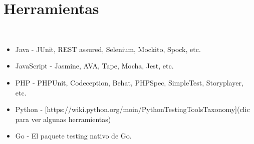 \section{Herramientas} 
\textbf{}\\
\begin{flushleft}


\begin{itemize}
Dependiendo del lenguaje de programación, puedes escoger entre decenas de frameworks que te permitirán hacer pruebas, algunos conocidos son:
\item	Java - JUnit, REST assured, Selenium, Mockito, Spock, etc.
\item	JavaScript - Jasmine, AVA, Tape, Mocha, Jest, etc.
\item	PHP - PHPUnit, Codeception, Behat, PHPSpec, SimpleTest, Storyplayer, etc.
\item	Python - [https://wiki.python.org/moin/PythonTestingToolsTaxonomy](clic para ver algunas herramientas)
\item	Go - El paquete testing nativo de Go.



	


\end{itemize} 


\end{flushleft}